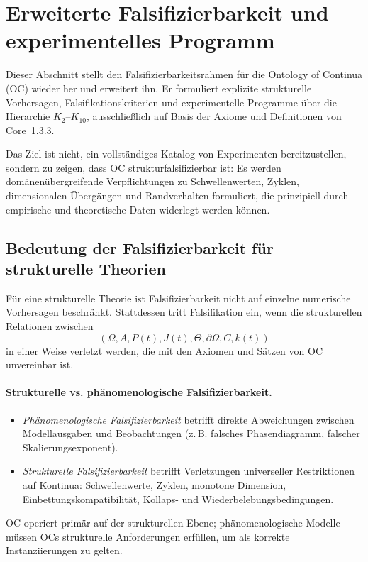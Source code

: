 
\section{Erweiterte Falsifizierbarkeit und experimentelles Programm}
\label{sec:falsifiability-extended}

Dieser Abschnitt stellt den Falsifizierbarkeitsrahmen für die
Ontology of Continua (OC) wieder her und erweitert ihn.
Er formuliert explizite strukturelle Vorhersagen,
Falsifikationskriterien und experimentelle Programme über die Hierarchie
\(K_2\)–\(K_{10}\), ausschließlich auf Basis der Axiome und Definitionen von Core~1.3.3.

Das Ziel ist nicht, ein vollständiges Katalog von Experimenten bereitzustellen, sondern zu zeigen,
dass OC strukturfalsifizierbar ist: Es werden domänenübergreifende Verpflichtungen zu
Schwellenwerten, Zyklen, dimensionalen Übergängen und Randverhalten formuliert,
die prinzipiell durch empirische und theoretische Daten widerlegt werden können.

\subsection{Bedeutung der Falsifizierbarkeit für strukturelle Theorien}

Für eine strukturelle Theorie ist Falsifizierbarkeit nicht auf einzelne
numerische Vorhersagen beschränkt. Stattdessen tritt Falsifikation ein,
wenn die strukturellen Relationen zwischen
\[
  (\Omega, A, P(t), J(t),
   \Theta, \partial\Omega, C, k(t))
\]
in einer Weise verletzt werden, die mit den Axiomen und Sätzen von OC unvereinbar ist.

\paragraph{Strukturelle vs. phänomenologische Falsifizierbarkeit.}
\begin{itemize}
  \item \emph{Phänomenologische Falsifizierbarkeit} betrifft direkte Abweichungen
        zwischen Modellausgaben und Beobachtungen (z.\,B. falsches Phasendiagramm,
        falscher Skalierungsexponent).
  \item \emph{Strukturelle Falsifizierbarkeit} betrifft Verletzungen universeller
        Restriktionen auf Kontinua: Schwellenwerte, Zyklen, monotone Dimension,
        Einbettungskompatibilität, Kollaps- und Wiederbelebungsbedingungen.
\end{itemize}
OC operiert primär auf der strukturellen Ebene; phänomenologische Modelle müssen
OCs strukturelle Anforderungen erfüllen, um als korrekte Instanziierungen zu gelten.

